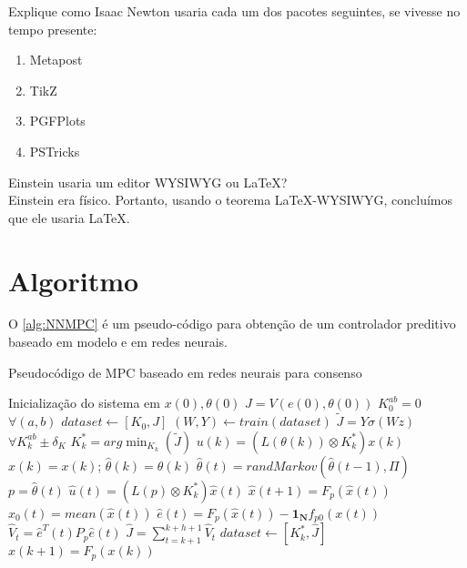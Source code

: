 \begin{exercise}\label{exc:in}
    Explique como Isaac Newton usaria cada um dos pacotes seguintes, se vivesse no tempo presente:
    \begin{enumerate}[label=(\alph*)]
        \item Metapost
        \item TikZ
        \item PGFPlots
        \item PSTricks
    \end{enumerate}
\end{exercise}

\begin{example}\label{exp:ae}
    Einstein usaria um editor WYSIWYG ou \LaTeX? \\
    Einstein era físico. Portanto, usando o teorema LaTeX-WYSIWYG, concluímos que ele usaria \LaTeX.
\end{example}

\section{Algoritmo}

O \cref{alg:NNMPC} é um pseudo-código para obtenção de um controlador preditivo baseado em modelo e em redes neurais.

\begin{algorithm}[htb]
\caption{Pseudocódigo de MPC baseado em redes neurais para consenso}
\label{alg:NNMPC}
\begin{algorithmic}[1] %
    \State Inicialização do sistema em $x(0), \theta(0)$
    \State $J = V(e(0),\theta(0))$
    \State $K^{ab}_0 = 0$ $\forall (a,b)$
    \State $dataset \gets [K_0,J]$
     
        \State $(W,Y) \gets train(dataset)$
        \State $\tilde{J} = Y\sigma(Wz)$ $\forall K^{ab}_k\pm \delta_K$
        \State $K_k^{\ast} = arg \min_{K_k}(\tilde{J})$
        \State $u(k) =  \left( L(\theta(k)) \otimes K_k^{\ast} \right) x(k)$
        \State $\hat{x}(k) = x(k)$; $\hat{\theta}(k) = \theta(k)$
         
            \State $\hat{\theta}(t) = randMarkov(\hat{\theta}(t-1),\Pi)$
             \State $p = \hat{\theta}(t)$
            \State $\hat{u}(t) = \left( L(p) \otimes K_k^{\ast} \right) \hat{x}(t)$
            \State $\hat{x}(t+1) = F_{p}(\hat{x}(t))$
            \State $x_0(t) = mean(\hat{x}(t))$
            \State $\hat{e}(t) = F_{p}(\hat{x}(t)) - \boldsymbol{1_N} f_{p0}(x(t)) $
            \State $\hat{V}_{t} = \hat{e}^T(t)P_{p}\hat{e}(t)$
            \EndFor
        \State $\hat{J} = \sum_{t = k+1}^{k+h+1} \hat{V}_{t}$
        \State $dataset \gets [K^{\ast}_k,\hat{J}]$
        \State $x(k+1) = F_{p}(x(k))$
    \EndFor
\end{algorithmic}
\end{algorithm}

